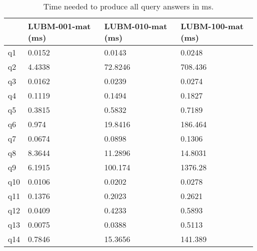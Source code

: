 \documentclass{article}
\begin{document}
\begin{enumerate}
\begin{table}[H]\centering
\begin{tabular}{|l|l|l|l|}
\hline
    & LUBM-001-mat (ms) & LUBM-010-mat (ms) & LUBM-100-mat (ms) \\ \hline
q1  & 0.0152            & 0.0143            & 0.0248            \\ \hline
q2  & 4.4338            & 72.8246           & 708.436           \\ \hline
q3  & 0.0162            & 0.0239            & 0.0274            \\ \hline
q4  & 0.1119            & 0.1494            & 0.1827            \\ \hline
q5  & 0.3815            & 0.5832            & 0.7189            \\ \hline
q6  & 0.974             & 19.8416           & 186.464           \\ \hline
q7  & 0.0674            & 0.0898            & 0.1306            \\ \hline
q8  & 8.3644            & 11.2896           & 14.8031           \\ \hline
q9  & 6.1915            & 100.174           & 1376.28           \\ \hline
q10 & 0.0106            & 0.0202            & 0.0278            \\ \hline
q11 & 0.1376            & 0.2023            & 0.2621            \\ \hline
q12 & 0.0409            & 0.4233            & 0.5893            \\ \hline
q13 & 0.0075            & 0.0388            & 0.5113            \\ \hline
q14 & 0.7846            & 15.3656           & 141.389           \\ \hline
\end{tabular}
\caption{Time needed to produce  all query answers in ms.}
\end{table}

\end{enumerate}
\newpage
\end{document}

